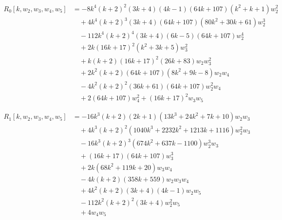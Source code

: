 \documentclass[11 pt]{amsart}
\theoremstyle{definition}
\theoremstyle{plain}
\begin{document}
\begin{align*}
R_0[k,w_2,w_3,w_4,w_5] &= -8 k^4 (k + 2)^2 (3 k + 4) (4 k - 1) (64 k + 107) (k^2 + k + 1) w_2^2 \\
&\quad + 4 k^4 (k + 2)^3 (3 k + 4) (64 k + 107) (80 k^2 + 30 k + 61) w_2^3 \\
&\quad -112 k^4 (k + 2)^4 (3 k + 4) (6 k - 5) (64 k + 107) w_2^4 \\
&\quad + 2 k (16 k + 17)^2 (k^2 + 3 k + 5) w_3^2 \\
&\quad + k (k + 2) (16 k + 17)^2 (26 k + 83) w_2 w_3^2 \\
&\quad + 2 k^2 (k + 2) (64 k + 107) (8 k^2 + 9 k - 8) w_2 w_4 \\
&\quad - 4 k^2 (k + 2)^2 (36 k + 61) (64 k + 107) w_2^2 w_4 \\
&\quad + 2 (64 k + 107) w_4^2 + (16 k + 17)^2 w_3 w_5
\end{align*}

\begin{align*}
R_1[k, w_2, w_3, w_4, w_5] &= -16 k^3 (k + 2) (2 k + 1) (13 k^3 + 24 k^2 + 7 k + 10) w_2 w_3 \\
&\quad + 4 k^3 (k + 2)^2 (1040 k^3 + 2232 k^2 + 1213 k + 1116) w_2^2 w_3 \\
&\quad - 16 k^3 (k + 2)^3 (674 k^2 + 637 k - 1100) w_2^3 w_3 \\
&\quad + (16 k + 17)(64 k + 107) w_3^3 \\
&\quad + 2 k (68 k^2 + 119 k + 20) w_3 w_4 \\
&\quad - 4 k (k + 2) (358 k + 559) w_2 w_3 w_4 \\
&\quad + 4 k^2 (k + 2) (3 k + 4) (4 k - 1) w_2 w_5 \\
&\quad - 112 k^2 (k + 2)^2 (3 k + 4) w_2^2 w_5 \\
&\quad + 4 w_4 w_5
\end{align*}
\end{document}
